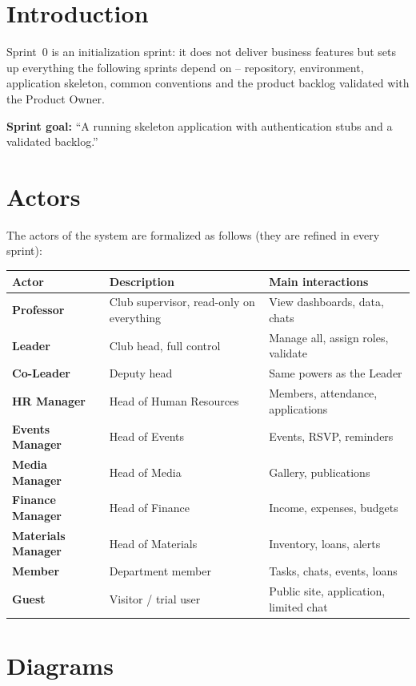 \documentclass[12pt,a4paper]{report}
\begin{document}
\section{Introduction}

Sprint~0 is an initialization sprint: it does not deliver business features but sets up
everything the following sprints depend on -- repository, environment, application
skeleton, common conventions and the product backlog validated with the Product Owner.

\textbf{Sprint goal:} ``A running skeleton application with authentication stubs and a
validated backlog.''

\section{Actors}

The actors of the system are formalized as follows (they are refined in every sprint):

\begin{center}
\begin{tabular}{>{\bfseries}p{2.4cm} p{5.2cm} p{5.8cm}}
\toprule
\textbf{Actor} & \textbf{Description} & \textbf{Main interactions} \\
\midrule
Professor     & Club supervisor, read-only on everything & View dashboards, data, chats \\
Leader        & Club head, full control & Manage all, assign roles, validate \\
Co-Leader     & Deputy head & Same powers as the Leader \\
HR Manager    & Head of Human Resources & Members, attendance, applications \\
Events Manager& Head of Events & Events, RSVP, reminders \\
Media Manager & Head of Media & Gallery, publications \\
Finance Manager & Head of Finance & Income, expenses, budgets \\
Materials Manager & Head of Materials & Inventory, loans, alerts \\
Member        & Department member & Tasks, chats, events, loans \\
Guest         & Visitor / trial user & Public site, application, limited chat \\
\bottomrule
\end{tabular}
\end{center}

\section{Diagrams}
\end{document}
